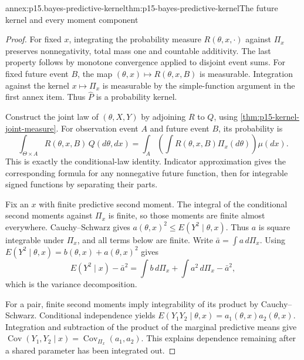 \begin{annexitem}{annex:p15.bayes-predictive-kernel}{thm:p15-bayes-predictive-kernel}{The future kernel and every moment component}
\begin{proof}
For fixed \(x\), integrating the probability measure
\(R(\theta,x,\cdot)\) against \(\Pi_x\) preserves nonnegativity,
total mass one and countable additivity. The last property follows
by monotone convergence applied to disjoint event sums.
For fixed future event \(B\), the map
\((\theta,x)\mapsto R(\theta,x,B)\) is measurable. Integration
against the kernel \(x\mapsto\Pi_x\) is measurable by the
simple-function argument in the first annex item.
Thus \(\widehat P\) is a probability kernel.

Construct the joint law of \((\theta,X,Y)\) by adjoining \(R\)
to \(Q\), using \cref{thm:p15-kernel-joint-measure}.
For observation event \(A\) and future event \(B\), its probability is
\[
 \int_{\Theta\times A}R(\theta,x,B)\,Q(d\theta,dx)
 =\int_A\left(\int R(\theta,x,B)\Pi_x(d\theta)\right)\mu(dx).
\]
This is exactly the conditional-law identity.
Indicator approximation gives the corresponding formula for
any nonnegative future function, then for integrable signed
functions by separating their parts.

Fix an \(x\) with finite predictive second moment. The integral
of the conditional second moments against \(\Pi_x\) is finite,
so those moments are finite almost everywhere. Cauchy--Schwarz
gives \(a(\theta,x)^2\leq E(Y^2\mid\theta,x)\).
Thus \(a\) is square integrable under \(\Pi_x\), and all terms
below are finite. Write \(\bar a=\int a\,d\Pi_x\). Using
\(E(Y^2\mid\theta,x)=b(\theta,x)+a(\theta,x)^2\) gives
\[
 E(Y^2\mid x)-\bar a^2
   =\int b\,d\Pi_x+\int a^2\,d\Pi_x-\bar a^2,
\]
which is the variance decomposition.

For a pair, finite second moments imply integrability of its
product by Cauchy--Schwarz. Conditional independence yields
\(E(Y_1Y_2\mid\theta,x)=a_1(\theta,x)a_2(\theta,x)\).
Integration and subtraction of the product of the marginal
predictive means give
\(\operatorname{Cov}(Y_1,Y_2\mid x)
 =\operatorname{Cov}_{\Pi_x}(a_1,a_2)\).
This explains dependence remaining after a shared parameter
has been integrated out.
\end{proof}
\end{annexitem}

